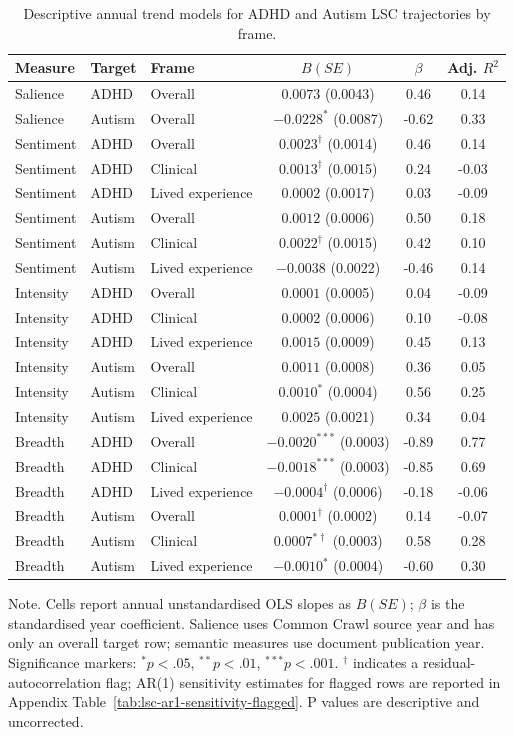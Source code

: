 \begin{table}[htbp]
\centering
\caption{Descriptive annual trend models for ADHD and Autism LSC trajectories by frame.}
\label{tab:lsc-regression-target-frames}
\scriptsize
\begin{tabular}{@{}lllccc@{}}
\toprule
Measure & Target & Frame & $B(SE)$ & $\beta$ & Adj. $R^2$ \\
\midrule
Salience & ADHD & Overall & $0.0073$ (0.0043) & 0.46 & 0.14 \\
Salience & Autism & Overall & $-0.0228^{*}$ (0.0087) & -0.62 & 0.33 \\
Sentiment & ADHD & Overall & $0.0023^{\dagger}$ (0.0014) & 0.46 & 0.14 \\
Sentiment & ADHD & Clinical & $0.0013^{\dagger}$ (0.0015) & 0.24 & -0.03 \\
Sentiment & ADHD & Lived experience & $0.0002$ (0.0017) & 0.03 & -0.09 \\
Sentiment & Autism & Overall & $0.0012$ (0.0006) & 0.50 & 0.18 \\
Sentiment & Autism & Clinical & $0.0022^{\dagger}$ (0.0015) & 0.42 & 0.10 \\
Sentiment & Autism & Lived experience & $-0.0038$ (0.0022) & -0.46 & 0.14 \\
Intensity & ADHD & Overall & $0.0001$ (0.0005) & 0.04 & -0.09 \\
Intensity & ADHD & Clinical & $0.0002$ (0.0006) & 0.10 & -0.08 \\
Intensity & ADHD & Lived experience & $0.0015$ (0.0009) & 0.45 & 0.13 \\
Intensity & Autism & Overall & $0.0011$ (0.0008) & 0.36 & 0.05 \\
Intensity & Autism & Clinical & $0.0010^{*}$ (0.0004) & 0.56 & 0.25 \\
Intensity & Autism & Lived experience & $0.0025$ (0.0021) & 0.34 & 0.04 \\
Breadth & ADHD & Overall & $-0.0020^{***}$ (0.0003) & -0.89 & 0.77 \\
Breadth & ADHD & Clinical & $-0.0018^{***}$ (0.0003) & -0.85 & 0.69 \\
Breadth & ADHD & Lived experience & $-0.0004^{\dagger}$ (0.0006) & -0.18 & -0.06 \\
Breadth & Autism & Overall & $0.0001^{\dagger}$ (0.0002) & 0.14 & -0.07 \\
Breadth & Autism & Clinical & $0.0007^{*\dagger}$ (0.0003) & 0.58 & 0.28 \\
Breadth & Autism & Lived experience & $-0.0010^{*}$ (0.0004) & -0.60 & 0.30 \\
\bottomrule
\end{tabular}
\parbox{\linewidth}{\footnotesize Note. Cells report annual unstandardised OLS slopes as $B(SE)$; $\beta$ is the standardised year coefficient. Salience uses Common Crawl source year and has only an overall target row; semantic measures use document publication year. Significance markers: $^{*}p<.05$, $^{**}p<.01$, $^{***}p<.001$. $^{\dagger}$ indicates a residual-autocorrelation flag; AR(1) sensitivity estimates for flagged rows are reported in Appendix Table~\ref{tab:lsc-ar1-sensitivity-flagged}. P values are descriptive and uncorrected.}
\end{table}
